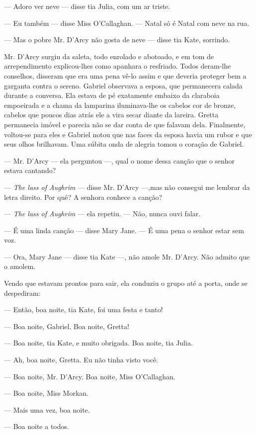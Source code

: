 --- Adoro ver neve --- disse tia Julia, com um ar triste.

--- Eu também --- disse Miss O'Callaghan. --- Natal só é Natal com
neve na rua.

--- Mas o pobre Mr. D'Arcy não gosta de neve --- disse tia Kate,
sorrindo.

Mr. D'Arcy surgiu da saleta, todo enrolado e abotoado, e em tom de
arrependimento explicou-lhes como apanhara o resfriado. Todos
deram-lhe conselhos, disseram que era uma pena vê-lo assim e que
deveria proteger bem a garganta contra o sereno. Gabriel observava a
esposa, que permanecera calada durante a conversa. Ela estava de pé
exatamente embaixo da claraboia empoeirada e a chama da lamparina
iluminava-lhe os cabelos cor de bronze, cabelos que poucos dias atrás
ele a vira secar diante da lareira. Gretta permanecia imóvel e parecia
não se dar conta de que falavam dela. Finalmente, voltou-se para eles
e Gabriel notou que nas faces da esposa havia um rubor e que seus
olhos brilhavam. Uma súbita onda de alegria tomou o coração de
Gabriel.

--- Mr. D'Arcy --- ela perguntou ---, qual o nome dessa canção que o
senhor estava cantando?

--- \textit{The lass of Aughrim} --- disse Mr. D'Arcy ---,mas não consegui me
lembrar da letra direito. Por quê? A senhora conhece a canção?

--- \textit{The lass of Aughrim} --- ela repetiu. --- Não, nunca ouvi falar.

--- É uma linda canção --- disse Mary Jane. --- É uma pena o senhor
estar sem voz.

--- Ora, Mary Jane --- disse tia Kate ---, não amole Mr. D'Arcy. Não
admito que o amolem.

Vendo que estavam prontos para sair, ela conduziu o grupo até a porta,
onde se despediram:

--- Então, boa noite, tia Kate, foi uma festa e tanto!

--- Boa noite, Gabriel. Boa noite, Gretta!

--- Boa noite, tia Kate, e muito obrigada. Boa noite, tia Julia.

--- Ah, boa noite, Gretta. Eu não tinha visto você.

--- Boa noite, Mr. D'Arcy. Boa noite, Miss O'Callaghan.

--- Boa noite, Miss Morkan.

--- Mais uma vez, boa noite.

--- Boa noite a todos.

